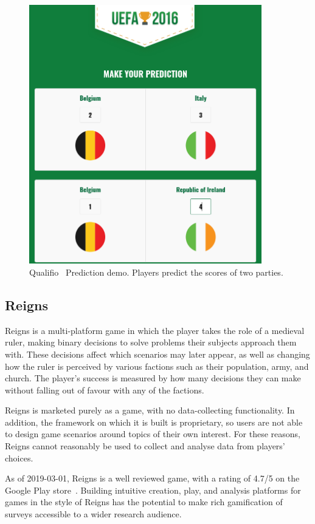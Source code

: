 \begin{figure}[!h]
	\centering
	\includegraphics[width=0.9\textwidth]{./images/context/pred.png}
	\caption{Qualifio~\cite{Qualifio} Prediction demo. Players predict the scores of two parties.}
	\label{fig:pred}
\end{figure}

\subsection{Reigns}
Reigns is a multi-platform game in which the player takes the role of a medieval ruler, making binary decisions to solve problems their subjects approach them with. 
These decisions affect which scenarios may later appear, as well as changing how the ruler is perceived by various factions such as their population, army, and church. 
The player's success is measured by how many decisions they can make without falling out of favour with any of the factions.

Reigns is marketed purely as a game, with no data-collecting functionality. In addition, the framework on which it is built is proprietary, so users are not able to design game scenarios around topics of their own interest. For these reasons, Reigns cannot reasonably be used to collect and analyse data from players' choices. 

As of 2019-03-01, Reigns is a well reviewed game, with a rating of 4.7/5 on the Google Play store~\cite{GooglePlay}.
Building intuitive creation, play, and analysis platforms for games in the style of Reigns has the potential to make rich gamification of surveys accessible to a wider research audience.
